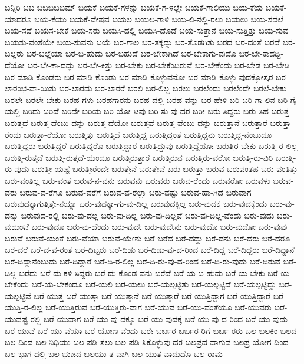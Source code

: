 {ಬನ್ನಿರಿ
ಬಬ
ಬಬಬಬಬಮ್
ಬಯಕೆ
ಬಯಕೆ-ಗಳನ್ನು
ಬಯಕೆ-ಗ-ಳಲ್ಲೇ
ಬಯಕೆ-ಗಾಲಿಯು
ಬಯ-ಕೆಯ
ಬಯಕೆ-ಯಾದರೂ
ಬಯ-ಕೆಯು
ಬಯಕೆ-ವೇಷವ
ಬಯಲ
ಬಯಲ-ಗಾಳಿ
ಬಯ-ಲಿ-ನಲ್ಲಿ-ರಲು
ಬಯಲು
ಬಯ-ಸದಲೆ
ಬಯ-ಸದೆ
ಬಯಸ-ಬೇಕೆ
ಬಯ-ಸರು
ಬಯಸಿ-ದಲ್ಲಿ
ಬಯಸಿ-ದೊಡೆ
ಬಯ-ಸುತ್ತಾನೆ
ಬಯ-ಸುತ್ತಿತ್ತು
ಬಯ-ಸುವ
ಬಯಸು-ವಂತೆಯೇ
ಬಯ-ಸುವನು
ಬಯೆ
ಬರ-ಗಾಲ
ಬರ-ತಕ್ಕದ್ದು
ಬರ-ತೊಡಗಿತು
ಬರದ
ಬರ-ದಂತೆ
ಬರದೆ
ಬರ-ಬಲ್ಲರು
ಬರ-ಬಲ್ಲೆಯಾ
ಬರ-ಬ-ಹುದು
ಬರ-ಬಹುದೆ
ಬರ-ಬೇಕಾಗಿದೆ
ಬರ-ಬೇಕಾಗು-ವುದೊ
ಬರ-ಬೇ-ಕಾದದ್ದಿ-ದೆಯೋ
ಬರ-ಬೇ-ಕಾ-ದದ್ದು
ಬರ-ಬೇ-ಕಿತ್ತು
ಬರ-ಬೇಕು
ಬರ-ಬೇಕೆಂದಿರುವೆ
ಬರ-ಬೇಕೆಂದು
ಬರ-ಬೇಡ
ಬರ-ಬೇಡಿ
ಬರ-ಮಾಡಿ-ಕೊಂಡರು
ಬರ-ಮಾಡಿ-ಕೊಂಡು
ಬರ-ಮಾಡಿ-ಕೊಳ್ಳುವನೋ
ಬರ-ಮಾಡಿ-ಕೊಳ್ಳು-ವುದಕ್ಕೋಸ್ಕರ
ಬರ-ಲಾರಂಭ-ವಾ-ಯಿತು
ಬರ-ಲಾರದು
ಬರ-ಲಾರರೆ
ಬರಲಿ
ಬರ-ಲಿಲ್ಲ
ಬರಲು
ಬರಲೆಂದು
ಬರಲೆಂದೇ
ಬರಲೆ-ಬೇಕು
ಬರಲೇ
ಬರಲೇ-ಬೇಕು
ಬರಹ-ಗಳು
ಬರಹಗಾರನು
ಬರಹ-ದಲ್ಲಿ
ಬರಹ-ವನ್ನು
ಬರ-ಹೇಳಿ
ಬರಿ
ಬರಿ-ಗಾ-ಲಿನ
ಬರಿ-ಗೈ-ಯಲ್ಲಿ
ಬರಿದು
ಬರಿದೆ
ಬರಿದೇ
ಬರಿಯ
ಬರಿ-ಯೋ-ಟವು
ಬರಿ-ಸು-ವು-ದರ
ಬರೀ
ಬರು-ತಿದ್ದರು
ಬರು-ತಿಹ
ಬರುತ್ತ
ಬರುತ್ತದೆ
ಬರುತ್ತ-ದೆಂಬು-ದನ್ನು
ಬರುತ್ತ-ದೆಯೋ
ಬರುತ್ತವೆ
ಬರುತ್ತ-ವೆಂಬು-ದನ್ನು
ಬರುತ್ತಾನೆ
ಬರುತ್ತಾರೆ
ಬರುತ್ತಾ-ರೆಂದು
ಬರುತ್ತಾ-ರೆಯೋ
ಬರುತ್ತಿತ್ತು
ಬರುತ್ತಿದೆ
ಬರುತ್ತಿದ್ದ
ಬರುತ್ತಿದ್ದಂತೆ
ಬರುತ್ತಿದ್ದನು
ಬರುತ್ತಿದ್ದ-ನೆಂಬುದೂ
ಬರುತ್ತಿದ್ದರು
ಬರುತ್ತಿದ್ದರೆ
ಬರುತ್ತಿದ್ದರೊ
ಬರುತ್ತಿದ್ದಾರೆ
ಬರುತ್ತಿದ್ದುವು
ಬರುತ್ತಿದ್ದೆಯೋ
ಬರುತ್ತಿರ-ಬೇಕು
ಬರುತ್ತಿ-ರ-ಲಿಲ್ಲ
ಬರುತ್ತಿ-ರುತ್ತದೆ
ಬರುತ್ತಿ-ರುತ್ತದೆ-ಯೆಂದೂ
ಬರುತ್ತಿರುತ್ತಾರೆ
ಬರುತ್ತಿರುವ
ಬರುತ್ತಿರು-ವರೋ
ಬರುತ್ತಿ-ರು-ವಿರಿ
ಬರುತ್ತಿ-ರು-ವುದು
ಬರುತ್ತೀ-ಯಷ್ಟೆ
ಬರುತ್ತೀರೆಂದೇ
ಬರುತ್ತೇನೆ
ಬರುತ್ತೇವೆ
ಬರು-ಬರುತ್ತಾ
ಬರುವ
ಬರುವಂತಹ
ಬರು-ವಂತಿತ್ತು
ಬರು-ವಂತಿಲ್ಲ
ಬರು-ವಂತೆ
ಬರುವ-ನ-ವನು
ಬರುವನು
ಬರುವರು
ಬರುವ-ರೆಂದು
ಬರುವರೋ
ಬರುವಳು
ಬರುವ-ವರು
ಬರುವ-ವ-ರೆಗೂ
ಬರುವ-ವರೆಗೆ
ಬರುವ-ವ-ರೆಲ್ಲಾ
ಬರು-ವಷ್ಟು
ಬರುವ-ಹಾ-ಗಿದೆ
ಬರುವಾಗ
ಬರುವುದಕ್ಕಾಗುತ್ತಿತ್ತೇ-ನಯ್ಯಾ
ಬರು-ವುದಕ್ಕಾ-ಗು-ವು-ದಿಲ್ಲ
ಬರುವುದಕ್ಕಿಲ್ಲ
ಬರು-ವುದಕ್ಕೆ
ಬರು-ವುದಕ್ಕೆಂದು
ಬರು-ವು-ದನ್ನು
ಬರುವುದ-ರಲ್ಲಿ
ಬರು-ವು-ದಲ್ಲ
ಬರು-ವು-ದಿಲ್ಲ
ಬರು-ವು-ದಿಲ್ಲವೆ
ಬರು-ವು-ದಿಲ್ಲ-ವೆಂದು
ಬರು-ವುದು
ಬರು-ವುದುಂಟೆ
ಬರು-ವುದೂ
ಬರು-ವು-ದೆಂದು
ಬರು-ವುದೇ
ಬರು-ವುದೇನು
ಬರು-ವುದೊ
ಬರು-ವುದೋ
ಬರು-ವುವು
ಬರುವೆ
ಬರುವೆ-ಯಂತೆ
ಬರು-ವೆಯಾ
ಬರುವೆ-ಯೇನು
ಬರೆ
ಬರೆದ
ಬರೆ-ದದ್ದು
ಬರೆ-ದನು
ಬರೆ-ದರು
ಬರೆ-ದರೂ
ಬರೆ-ದರೆ
ಬರೆ-ದ-ವ-ರಂತೆ
ಬರೆ-ದಿಟ್ಟರು
ಬರೆ-ದಿಡು
ಬರೆ-ದಿಡು-ವು-ದ-ರಿಂದ
ಬರೆ-ದಿದ್ದ
ಬರೆ-ದಿದ್ದರು
ಬರೆ-ದಿದ್ದಾನೆ
ಬರೆ-ದಿದ್ದಾನೆಂಬುದು
ಬರೆ-ದಿದ್ದಾರೆ
ಬರೆ-ದಿ-ರ-ಲಿಲ್ಲ
ಬರೆ-ದಿ-ರು-ವು-ದ-ರಿಂದ
ಬರೆ-ದಿ-ರು-ವುದು
ಬರೆ-ದಿರುವೆ
ಬರೆ-ದಿಲ್ಲ
ಬರೆದು
ಬರೆ-ದು-ಕಳಿ-ಸಿದ್ದರು
ಬರೆ-ದು-ಕೊಂಡ-ವನು
ಬರೆದೆ
ಬರೆ-ಯ-ಬ-ಹುದು
ಬರೆ-ಯ-ಬೇಕು
ಬರೆ-ಯ-ಬೇಕೆಂದು
ಬರೆ-ಯ-ಬೇಕೆಂದೂ
ಬರೆ-ಯಲಿ
ಬರೆ-ಯಲು
ಬರೆ-ಯಲ್ಪಟ್ಟಿತು
ಬರೆ-ಯಲ್ಪಟ್ಟಿದೆ
ಬರೆ-ಯಲ್ಪಟ್ಟಿದ್ದು
ಬರೆ-ಯಲ್ಪಟ್ಟಿವೆ
ಬರೆ-ಯುತ್ತ
ಬರೆ-ಯುತ್ತಾ
ಬರೆ-ಯುತ್ತಾನೆ
ಬರೆ-ಯುತ್ತಾರೆ
ಬರೆ-ಯುತ್ತಿದ್ದಾಗ
ಬರೆ-ಯುತ್ತಿದ್ದಾರೆ
ಬರೆ-ಯುತ್ತಿ-ರ-ಲಿಲ್ಲ
ಬರೆ-ಯುತ್ತಿರುವ
ಬರೆ-ಯುತ್ತಿರು-ವಾಗ
ಬರೆ-ಯುವ
ಬರೆ-ಯು-ವಂತೆಯೂ
ಬರೆ-ಯುವರು
ಬರೆ-ಯುವಷ್ಟ-ರಲ್ಲಿ
ಬರೆ-ಯುವಾಗ
ಬರೆ-ಯು-ವು-ದಕ್ಕೂ
ಬರೆ-ಯು-ವುದಕ್ಕೆ
ಬರೆ-ಯು-ವು-ದ-ರಿಂದ
ಬರೆ-ಯು-ವುದು
ಬರೆ-ಯುವೆ
ಬರೆ-ಯು-ವೆಯಾ
ಬರೆ-ಯೋಣ-ವೆಂದು
ಬರೇ
ಬರ್ಬರ
ಬರ್ಬರ-ರಿಗೆ
ಬರ್ಬ-ರರು
ಬಲ
ಬಲಕಿಂ
ಬಲದ
ಬಲ-ದಿಂದ
ಬಲ-ನಿಧಿಯು
ಬಲ-ಪಡಿ-ಸಲು
ಬಲ-ಪಡಿ-ಸಿಕೊಳ್ಳುವು-ದರ
ಬಲಪ್ರದ-ವಾಗುವ
ಬಲಪ್ರ-ಯೋಗ-ದಿಂದ
ಬಲ-ಭಾಗ-ದಲ್ಲಿ
ಬಲ-ಭುಜದ
ಬಲಯು-ತ-ವಾಗಿ
ಬಲ-ಯುತ-ವಾದುದೊ
ಬಲ-ರಾಮ
}
